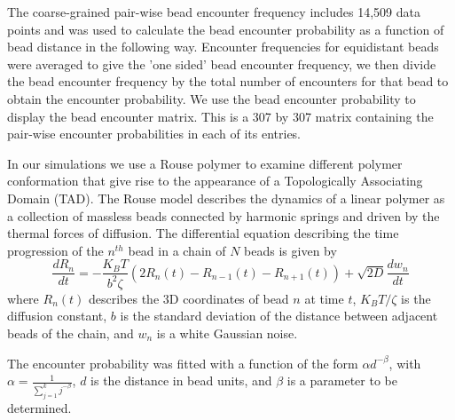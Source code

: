 \documentclass[12pt]{paper}
\begin{document}
The coarse-grained pair-wise bead encounter frequency includes 14,509 data points and was used to calculate the bead encounter probability as a function of bead distance in the following way. Encounter frequencies for equidistant beads were averaged to give the 'one sided' bead encounter frequency, we then divide the bead encounter frequency by the total number of encounters for that bead to obtain the encounter probability. We use the bead encounter probability to display the bead encounter matrix. This is a 307 by 307 matrix containing the pair-wise encounter probabilities in each of its entries.

In our simulations we use a Rouse polymer to examine different polymer conformation that give rise to the appearance of a Topologically Associating Domain (TAD). The Rouse model describes the dynamics of a linear polymer as a collection of massless beads connected by harmonic springs and driven by the thermal forces of diffusion. 
The differential equation describing the time progression of the $n^{th}$ bead in a chain of $N$ beads is given by 
\begin{equation}
\frac{dR_n}{dt}=-\frac{K_BT}{b^2\zeta}(2R_n(t)-R_{n-1}(t)-R_{n+1}(t))+\sqrt{2D}\frac{dw_n}{dt}
\end{equation}
where $R_n(t)$ describes the 3D coordinates of bead $n$ at time $t$, $K_BT/\zeta$ is the diffusion constant, $b$ is the standard deviation of the distance between adjacent beads of the chain, and $w_n$ is a white Gaussian noise. 






The encounter probability was fitted with a function of the form  $\alpha d^{-\beta}$, with $\alpha = \frac{1}{\sum_{j=1}^k j^{-\beta}}$, $d$ is the distance in bead units, and $\beta$ is a parameter to be determined.
\end{document}
